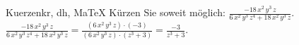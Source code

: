 \begin{MAufgabe}{Kuerzen}{kr, dh, MaTeX}
K\"urzen Sie soweit m\"oglich: $\frac{- 18\, x^2\, y^3\, z}{6\, x^2\, y^3\, z^4 + 18\, x^2\, y^3\, z}$.\\ 
\ifLsg\MLoesung
\quad $\frac{- 18\, x^2\, y^3\, z}{6\, x^2\, y^3\, z^4 + 18\, x^2\, y^3\, z}=\frac{(6\, x^2\, y^3\, z)\cdot(-3)}{(6\, x^2\, y^3\, z)\cdot(z^3 + 3)}=\frac{-3}{z^3 + 3}$.\else\relax\fi
 \end{MAufgabe}